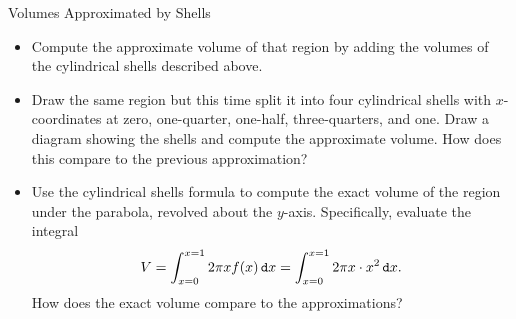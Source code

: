 \begin{exercise}{Volumes Approximated by Shells \Coffeecup \Coffeecup}
\begin{itemize}
\item Compute the approximate volume of that region by adding the volumes of the cylindrical shells described above.


\item Draw the same region but this time split it into four cylindrical shells with $x$-coordinates at zero, one-quarter, one-half, three-quarters, and one.  Draw a diagram showing the shells and compute the approximate volume. How does this compare to the previous approximation?


 \item Use the cylindrical shells formula to compute the exact volume of the region under the parabola, revolved about the $y$-axis.  Specifically, evaluate the integral $$ V= \int_{x=0}^{x=1} 2 \pi x f(x) \mathop{}\!\mathtt{d} x=\int_{x=0}^{x=1} 2 \pi x \cdot x^2 \mathop{}\!\mathtt{d} x. $$  How does the exact volume compare to the approximations?


\end{itemize}
\end{exercise}
